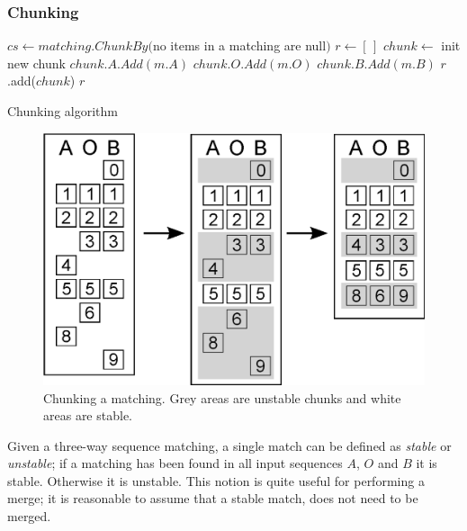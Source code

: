 \documentclass[11pt]{article}
\begin{document}
\subsubsection{Chunking}

\begin{algorithm}
\begin{algorithmic}
	\State $cs \gets matching.ChunkBy($no items in a matching are null$)$
	\State $r \gets [\,]$
		\State $chunk \gets $ init new chunk
				\State $chunk.A.Add(m.A)$
			\EndIf
				\State $chunk.O.Add(m.O)$
			\EndIf
				\State $chunk.B.Add(m.B)$
			\EndIf
		\EndFor
		\State $r$.add($chunk$)
	\EndFor
	\State \Return $r$
\EndFunction
\end{algorithmic}
\caption{Chunking algorithm}
  \label{CunkingAlgorithm}
\end{algorithm}

\begin{figure}
   \centerline{\includegraphics[scale=0.6]{drawings/eps/threewaymatching-chunking.eps}}
   \caption{Chunking a matching. Grey areas are unstable chunks and white areas are stable.}
   \label{Chunking}
\end{figure}

Given a three-way sequence matching, a single match can be defined as \textit{stable} or \textit{unstable}; if a matching has been found in all input sequences $A$, $O$ and $B$ it is stable. Otherwise it is unstable. This notion is quite useful for performing a merge; it is reasonable to assume that a stable match, does not need to be merged.
\end{document}
